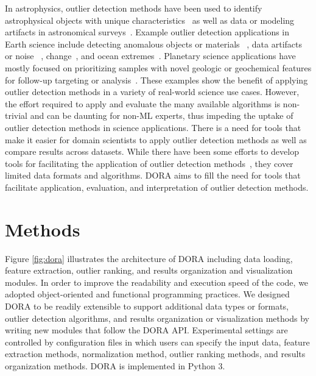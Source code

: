 \documentclass[utf8]{frontiersFPHY} %
\begin{document}
In astrophysics, 
outlier detection methods have been used to identify astrophysical
objects with unique characteristics~\cite{hayat2021self} 
as well as data or modeling 
artifacts in astronomical surveys~\citep{wagstaff:des-anom20}. 
Example outlier detection applications in 
Earth science include detecting anomalous objects or materials
~\cite{zhou2016novel}, data artifacts or noise 
~\cite{liu2017unsupervised}, change~\cite{touati2020anomaly}, 
and ocean extremes~\cite{prochaska2021deep}. 
Planetary science applications have mostly focused 
on prioritizing samples with novel geologic or geochemical features for
follow-up targeting or analysis~\cite{kerner2020comparison,
wagstaff:demud13}.
%
These examples show the benefit of applying outlier detection methods in
a variety of real-world science use cases. However, the effort required to 
apply and evaluate the many available algorithms is non-trivial and can 
be daunting for non-ML experts, thus impeding the uptake of outlier
detection methods in science applications.  
There is a need for tools that make it easier for domain scientists to apply
outlier detection methods as well as compare results across datasets.
While there have been some efforts to develop tools for facilitating the
application of outlier detection methods~\cite{zhao2019pyod}, they cover
limited data formats and algorithms. DORA aims to fill the need 
for tools that facilitate application, evaluation, and interpretation of outlier
detection methods.


\section{Methods}
Figure \ref{fig:dora} illustrates the architecture of DORA including 
data loading, feature extraction, outlier ranking, and results organization
and visualization modules. 
In order to improve the readability and execution speed of the code, we adopted
object-oriented and functional programming practices.  We designed DORA to be 
readily extensible to support additional data types or formats, outlier detection 
algorithms, and results organization or visualization methods by writing new 
modules that follow the DORA API. Experimental settings are controlled by 
configuration files in which users can specify the input data, 
feature extraction methods, normalization method, outlier ranking methods, and 
results organization methods. 
DORA is implemented in Python 3.
\end{document}
